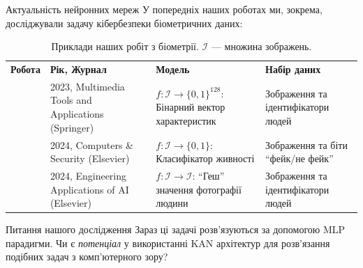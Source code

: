 \documentclass{zkdl-presentation-template}
\begin{document}
    \begin{frame}{Актуальність нейронних мереж}
        У попередніх наших роботах
        \cite{our-biometrics-1,our-biometrics-2,our-biometrics-3} ми, зокрема,
        досліджували задачу кібербезпеки біометричних даних:

        \begin{table}
            \scriptsize
            \centering
            \begin{tabularx}{\textwidth}{|c|X|X|X|}
                \hline
                \cellcolor{gray!20}\textbf{Робота} & \cellcolor{gray!20}\textbf{Рік, Журнал} & \cellcolor{gray!20}\textbf{Модель} & \cellcolor{gray!20}\textbf{Набір даних} \\
                \cite{our-biometrics-1} & 2023, Multimedia Tools and Applications (Springer) & $f: \mathcal{I} \to \{0,1\}^{128}$: Бінарний вектор характеристик & Зображення та ідентифікатори людей \\
                \cite{our-biometrics-2} & 2024, Computers \& Security (Elsevier) & $f: \mathcal{I} \to \{0,1\}$: Класифікатор живності & Зображення та біти ``фейк/не фейк'' \\
                \cite{our-biometrics-3} & 2024, Engineering Applications of AI (Elsevier) & $f: \mathcal{I} \to \mathcal{I}$: ``Геш'' значення фотографії людини & Зображення та ідентифікатори людей \\
                \hline
            \end{tabularx}
            \caption{Приклади наших робіт з біометрії. $\mathcal{I}$ --- множина зображень.}
        \end{table}

        \begin{alertblock}{Питання нашого дослідження}
            Зараз ці задачі розв'язуються за допомогою MLP парадигми. Чи є
            \textit{потенціал} у використанні KAN архітектур для розв'язання 
            подібних задач з комп'ютерного зору?
        \end{alertblock}
    \end{frame}
\end{document}
